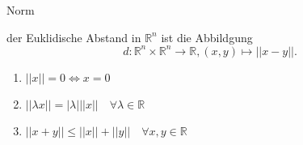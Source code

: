 \documentclass[class=article, crop=false]{standalone}
\begin{document}
\begin{zettel}{Norm}
\begin{flashcard}
    \begin{definition}
        der Euklidische Abstand in $\mathbb{R}^n $ ist die Abbildgung
        \[
            d: \mathbb{R}^n \times \mathbb{R}^n \longrightarrow  \mathbb{R}, (x,y) \mapsto ||x-y||
        .\]
    \end{definition}
    \begin{enumerate}
        \item $ ||x|| = 0 \iff x = 0$ 
        \item $ ||\lambda x|| = |\lambda| ||x|| \quad \forall \lambda \in  \mathbb{R}$ 
        \item $ ||x + y|| \leq  ||x|| + ||y|| \quad \forall x,y \in \mathbb{R}$ 
    \end{enumerate}

\end{flashcard}
\end{zettel}
\end{document}
